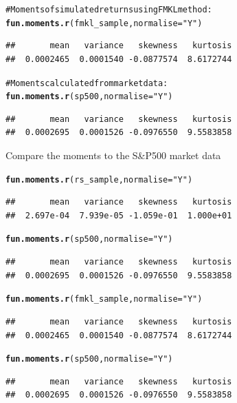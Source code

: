 \documentclass[12pt, a4paper, oneside]{article}\usepackage{graphicx, color}
\makeatletter
\newcommand{\hlfunctioncall}[1]{\textcolor[rgb]{0.501960784313725,0,0.329411764705882}{\textbf{#1}}}%
\newcommand{\hlstring}[1]{\textcolor[rgb]{0.6,0.6,1}{#1}}%
\newcommand{\hlcomment}[1]{\textcolor[rgb]{0.180392156862745,0.6,0.341176470588235}{#1}}%
\newenvironment{kframe}{%
 \def\at@end@of@kframe{}%
 \ifinner\ifhmode%
  \def\at@end@of@kframe{\end{minipage}}%
  \begin{minipage}{\columnwidth}%
 \fi\fi%
 \def\FrameCommand##1{\hskip\@totalleftmargin \hskip-\fboxsep
 \colorbox{shadecolor}{##1}\hskip-\fboxsep
     \hskip-\linewidth \hskip-\@totalleftmargin \hskip\columnwidth}%
 \MakeFramed {\advance\hsize-\width
   \@totalleftmargin\z@ \linewidth\hsize
   \@setminipage}}%
 {\par\unskip\endMakeFramed%
 \at@end@of@kframe}
\newenvironment{knitrout}{}{} %
\makeatother
\begin{document}
\begin{knitrout}
\begin{kframe}
\begin{alltt}
\hlcomment{# Moments of simulated returns using FMKL method:}
\hlfunctioncall{fun.moments.r}(fmkl_sample, normalise = \hlstring{"Y"})
\end{alltt}
\begin{verbatim}
##       mean   variance   skewness   kurtosis 
##  0.0002465  0.0001540 -0.0877574  8.6172744
\end{verbatim}
\begin{alltt}

\hlcomment{# Moments calculated from market data:}
\hlfunctioncall{fun.moments.r}(sp500, normalise = \hlstring{"Y"})
\end{alltt}
\begin{verbatim}
##       mean   variance   skewness   kurtosis 
##  0.0002695  0.0001526 -0.0976550  9.5583858
\end{verbatim}
\end{kframe}
\end{knitrout}

Compare the moments to the S\&P500 market data
\begin{knitrout}
\color{fgcolor}\begin{kframe}
\begin{alltt}
\hlfunctioncall{fun.moments.r}(rs_sample, normalise = \hlstring{"Y"})
\end{alltt}
\begin{verbatim}
##       mean   variance   skewness   kurtosis 
##  2.697e-04  7.939e-05 -1.059e-01  1.000e+01
\end{verbatim}
\begin{alltt}
\hlfunctioncall{fun.moments.r}(sp500, normalise = \hlstring{"Y"})
\end{alltt}
\begin{verbatim}
##       mean   variance   skewness   kurtosis 
##  0.0002695  0.0001526 -0.0976550  9.5583858
\end{verbatim}
\begin{alltt}
\hlfunctioncall{fun.moments.r}(fmkl_sample, normalise = \hlstring{"Y"})
\end{alltt}
\begin{verbatim}
##       mean   variance   skewness   kurtosis 
##  0.0002465  0.0001540 -0.0877574  8.6172744
\end{verbatim}
\begin{alltt}
\hlfunctioncall{fun.moments.r}(sp500, normalise = \hlstring{"Y"})
\end{alltt}
\begin{verbatim}
##       mean   variance   skewness   kurtosis 
##  0.0002695  0.0001526 -0.0976550  9.5583858
\end{verbatim}
\end{kframe}
\end{knitrout}
\end{document}
